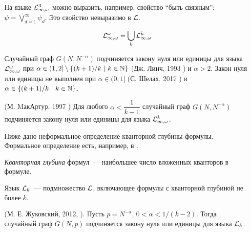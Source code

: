 На языке $\mathcal{L}^3_{\infty, \omega}$ можно выразить, например, свойство ``быть связным'': $\psi = \bigvee_{d=1}^\infty \psi_d$.
Это свойство невыразимо в $\mathcal{L}$.

\Def \[\mathcal{L}^\omega_{\infty, \omega} = \bigcup_k \mathcal{L}^k_{\infty, \omega} \]

\begin{theorem}
Случайный граф $G(N, N^{-\alpha})$ подчиняется закону нуля или единицы для языка $\mathcal{L}^\omega_{\infty, \omega}$ при $\alpha \in (1,2] \setminus \{(k+1)/k ~|~ k \in \mathbb {N} \}$ (Дж. Линч, 1993  \cite{lynch1993infinitary}) и $\alpha > 2$.
Закон нуля или единицы не выполнен при $\alpha \in (0,1]$ (С. Шелах, 2017 \cite{shelah2017failure})  и $\alpha \in \{(k+1)/k ~|~ k \in \mathbb {N} \}$.
\end{theorem}

\begin{theorem} (М. MакАртур, 1997 \cite{mcarthur1997asymptotic})
Для любого $\alpha < \dfrac{1}{k-1}$ случайный граф $G(N, N^{-\alpha})$ подчиняется закону нуля или единицы для языка $\mathcal{L}^k_{\infty, \omega}$.
\end{theorem}

Ниже дано неформальное определение кванторной глубины формулы.
Формальное определение есть, например, в \cite{shen}.

\Def \textit{Кванторная глубина} формул~--- наибольшее число вложенных кванторов в формуле.

\Def Язык $\mathcal{L}_k$~--- подмножество $\mathcal{L}$, включающее формулы с кванторной глубиной не более $k$.

\begin{theorem}(М. Е. Жуковский, 2012, \cite{zhukovskii2012zero}). Пусть $p=N^{-\alpha}$, $0 < \alpha < 1/(k - 2)$. 
Тогда случайный граф $G(N, p)$ подчиняется закону нуля или единицы для языка $\mathcal{L}_k$.
\end{theorem}